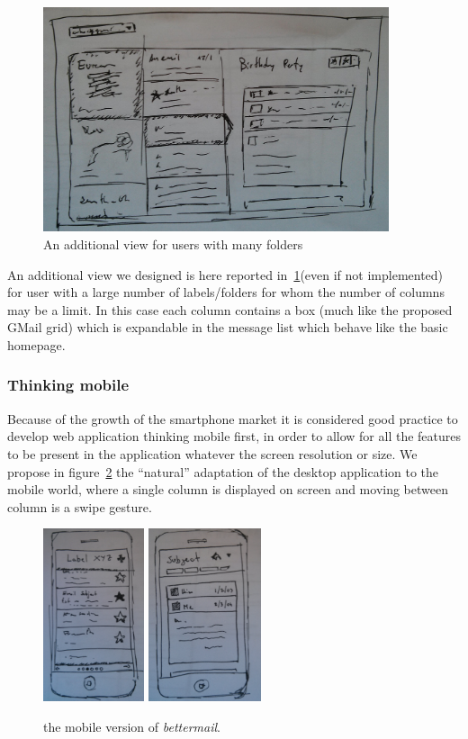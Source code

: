 \documentclass[a4paper,12pt]{report}
\begin{document}
\begin{figure}[H]
  \centering
  \includegraphics[width=4in]{new_3_cols}
  \caption{An additional view for users with many folders}
  \label{fig:new3}
\end{figure}
An additional view we designed is here reported in~\ref{fig:new3}(even if not implemented) for user with a large number of labels/folders for whom the number of columns may be a limit. In this case each column contains a box (much like the proposed GMail grid) which is expandable in the message list which behave like the basic homepage.

\subsubsection{Thinking mobile}
Because of the growth of the smartphone market it is considered good practice to develop web application thinking mobile first, in order to allow for all the features to be present in the application whatever the screen resolution or size. We propose in figure~\ref{fig:mobile} the ``natural'' adaptation of the desktop application to the mobile world, where a single column is displayed on screen and moving between column is a swipe gesture.
\begin{figure}[H]
  \centering
  \includegraphics[height=2in]{list}
  \includegraphics[height=2in]{email}
  \caption{the mobile version of \emph{bettermail}.}
  \label{fig:mobile}
\end{figure}
\end{document}
